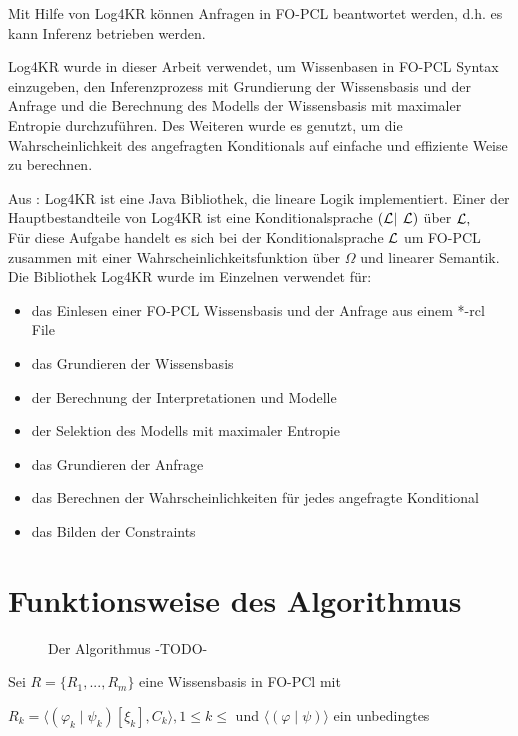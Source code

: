 \documentclass[a4paper, 11pt]{book}
\begin{document}
Mit Hilfe von Log4KR können Anfragen in FO-PCL beantwortet werden, d.h. es kann Inferenz betrieben werden.  

Log4KR wurde in dieser Arbeit verwendet, um Wissenbasen in FO-PCL Syntax einzugeben, den Inferenzprozess mit Grundierung der Wissensbasis und der Anfrage und die Berechnung des Modells der Wissensbasis mit maximaler Entropie durchzuführen. Des Weiteren wurde es genutzt, um die Wahrscheinlichkeit des angefragten Konditionals auf einfache und effiziente Weise zu berechnen.


Aus \cite{P15}: Log4KR ist eine Java Bibliothek, die lineare Logik implementiert. Einer der Hauptbestandteile von Log4KR ist eine Konditionalsprache $ (\cal L $$ \mid $  $ \cal L )$ über $ \cal L, $ \\
Für diese Aufgabe handelt es sich bei der Konditionalsprache $ \cal L $ um FO-PCL zusammen mit einer Wahrscheinlichkeitsfunktion über $ \Omega $ und linearer Semantik. \\

Die Bibliothek Log4KR wurde im Einzelnen verwendet für:\\
\begin{itemize}
	\item das Einlesen einer FO-PCL Wissensbasis und der Anfrage aus einem *-rcl File
	\item das Grundieren der Wissensbasis
	\item der Berechnung der Interpretationen und Modelle
	\item der Selektion des Modells mit maximaler Entropie
	\item das Grundieren der Anfrage
	\item das Berechnen der Wahrscheinlichkeiten für jedes angefragte Konditional
	\item das Bilden der Constraints 
\end{itemize}


\section{Funktionsweise des Algorithmus}
\begin{figure}[h]
	
	
	
	\caption{Der Algorithmus -TODO-}
	
\end{figure}
Sei $ R = \{R_1, ..., R_m\} $ eine Wissensbasis in FO-PCl mit

$ R_k =  \langle(\varphi_k \mid \psi_k)[\xi_k], C_k \rangle , 1 \leq k \leq  $ und  $ \langle (\varphi \mid \psi) \rangle $ ein unbedingtes
\end{document}
